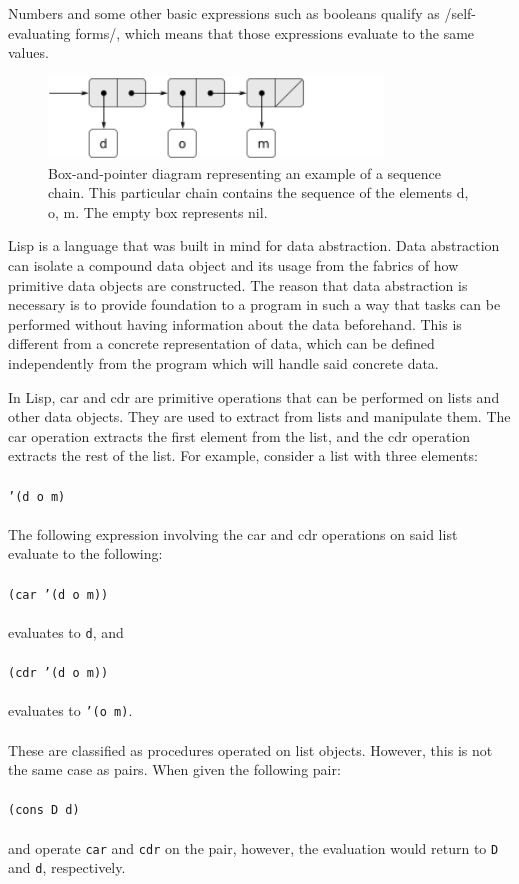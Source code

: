 \documentclass[journal]{IEEEtran}
\begin{document}
Numbers and some other basic expressions such as booleans qualify as /self-evaluating forms/, which means that those expressions evaluate to the same values.  

\begin{figure}
	\centering
	\includegraphics[width=3.5in]{Chain}
	\caption{Box-and-pointer diagram representing an example of a sequence chain. This particular chain contains the sequence of the elements d, o, m. The empty box represents nil.}
	\label{Data representation}
\end{figure}

Lisp is a language that was built in mind for data abstraction. Data abstraction can isolate a compound data object and its usage from the fabrics of how primitive data objects are constructed. The reason that data abstraction is necessary is to provide foundation to a program in such a way that tasks can be performed without having information about the data beforehand. This is different from a concrete representation of data, which can be defined independently from the program which will handle said concrete data.

In Lisp, car and cdr are primitive operations that can be performed on lists and other data objects. They are used to extract from lists and manipulate them.  The car operation extracts the first element from the list, and the cdr operation extracts the rest of the list. For example, consider a list with three elements: \\\\\texttt{'(d o m)}\\\\ The following expression involving the car and cdr operations on said list evaluate to the following: \\\\\texttt{(car  '(d o m))}\\\\ evaluates to \texttt{d}, and \\\\\texttt{(cdr '(d o m))}\\\\ evaluates to \texttt{'(o m)}.\\\\ These are classified as procedures operated on list objects. However, this is not the same case as pairs. When given the following pair: \\\\\texttt{(cons D d)}\\\\ and operate \texttt{car} and \texttt{cdr} on the pair, however, the evaluation would return to \texttt{D} and \texttt{d}, respectively.
\end{document}

